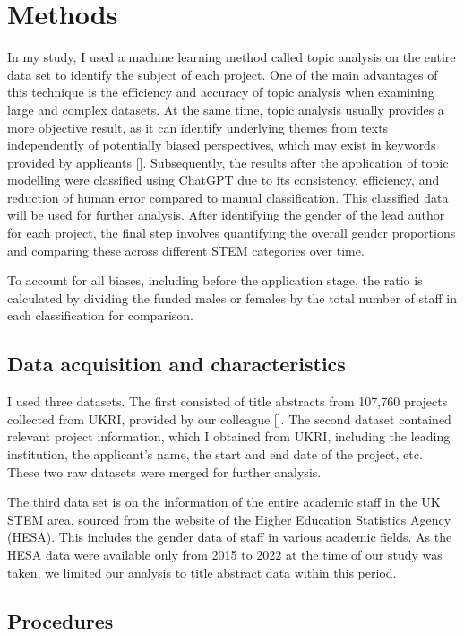 \section{Methods}

In my study, I used a machine learning method called topic analysis on the entire data set to identify the subject of each project. One of the main advantages of this technique is the efficiency and accuracy of topic analysis when examining large and complex datasets. At the same time, topic analysis usually provides a more objective result, as it can identify underlying themes from texts independently of potentially biased perspectives, which may exist in keywords provided by applicants [\cite{hagen2018content}]. Subsequently, the results after the application of topic modelling were classified using ChatGPT due to its consistency, efficiency, and reduction of human error compared to manual classification. This classified data will be used for further analysis. After identifying the gender of the lead author for each project, the final step involves quantifying the overall gender proportions and comparing these across different STEM categories over time.

To account for all biases, including before the application stage, the ratio is calculated by dividing the funded males or females by the total number of staff in each classification for comparison.

\subsection{Data acquisition and characteristics}
I used three datasets. The first consisted of title abstracts from 107,760 projects collected from UKRI, provided by our colleague [\cite{Flavia}]. The second dataset contained relevant project information, which I obtained from UKRI, including the leading institution, the applicant's name, the start and end date of the project, etc. These two raw datasets were merged for further analysis.

The third data set is on the information of the entire academic staff in the UK STEM area, sourced from the website of the Higher Education Statistics Agency (HESA). This includes the gender data of staff in various academic fields. As the HESA data were available only from 2015 to 2022 at the time of our study was taken, we limited our analysis to title abstract data within this period.

\subsection{Procedures}

